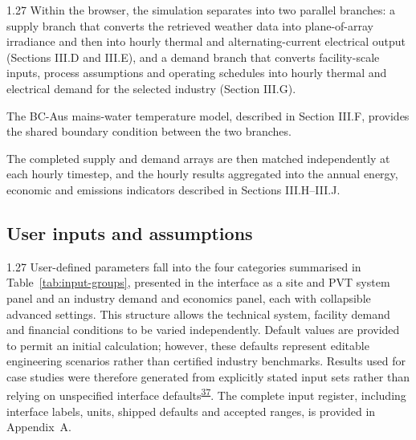 \documentclass[12pt,letterpaper]{article}
\newcommand{\done}{\ \textcolor{green!45!black}{$\checkmark$}} %
\DeclareRobustCommand{\citenum}[1]{\hyperlink{ref:#1}{#1}} %
\begin{document}
\begin{spacing}{1.27}
Within the browser, the simulation separates into two parallel branches: a supply branch that converts the retrieved weather data into plane-of-array irradiance and then into hourly thermal and alternating-current electrical output (Sections III.D and III.E), and a demand branch that converts facility-scale inputs, process assumptions and operating schedules into hourly thermal and electrical demand for the selected industry (Section III.G).\par

\vspace{0.15in}

The BC-Aus mains-water temperature model, described in Section III.F, provides the shared boundary condition between the two branches.\par

\vspace{0.15in}

The completed supply and demand arrays are then matched independently at each hourly timestep, and the hourly results aggregated into the annual energy, economic and emissions indicators described in Sections III.H--III.J.\par
\end{spacing}

\subsection[User inputs and assumptions\done]{User inputs and assumptions}\label{sec19}

\begin{spacing}{1.27}
User-defined parameters fall into the four categories summarised in Table~\ref{tab:input-groups}, presented in the interface as a site and PVT system panel and an industry demand and economics panel, each with collapsible advanced settings. This structure allows the technical system, facility demand and financial conditions to be varied independently. Default values are provided to permit an initial calculation; however, these defaults represent editable engineering scenarios rather than certified industry benchmarks. Results used for case studies were therefore generated from explicitly stated input sets rather than relying on unspecified interface defaults\textsuperscript{\citenum{37}}. The complete input register, including interface labels, units, shipped defaults and accepted ranges, is provided in Appendix~A.\par
\end{spacing}
\end{document}
